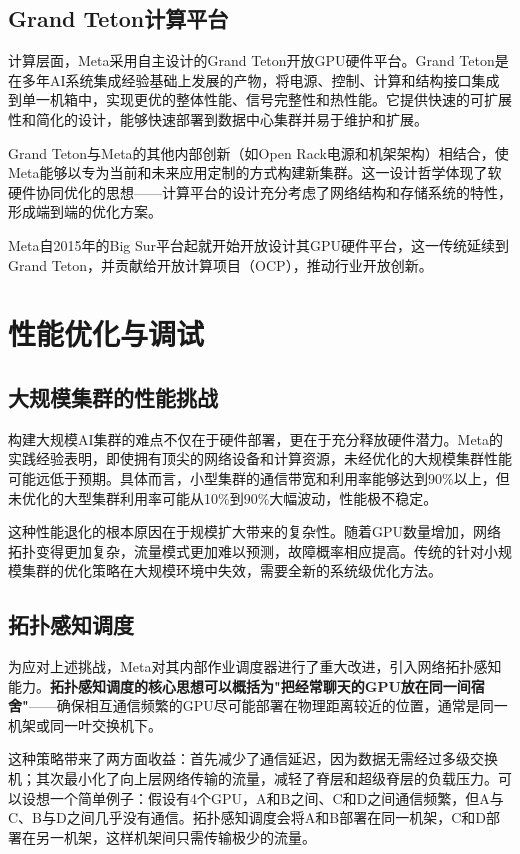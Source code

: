 \subsection{Grand Teton计算平台}

计算层面，Meta采用自主设计的Grand Teton开放GPU硬件平台。Grand Teton是在多年AI系统集成经验基础上发展的产物，将电源、控制、计算和结构接口集成到单一机箱中，实现更优的整体性能、信号完整性和热性能。它提供快速的可扩展性和简化的设计，能够快速部署到数据中心集群并易于维护和扩展。

Grand Teton与Meta的其他内部创新（如Open Rack电源和机架架构）相结合，使Meta能够以专为当前和未来应用定制的方式构建新集群。这一设计哲学体现了软硬件协同优化的思想——计算平台的设计充分考虑了网络结构和存储系统的特性，形成端到端的优化方案。

Meta自2015年的Big Sur平台起就开始开放设计其GPU硬件平台，这一传统延续到Grand Teton，并贡献给开放计算项目（OCP），推动行业开放创新。

\section{性能优化与调试}

\subsection{大规模集群的性能挑战}

构建大规模AI集群的难点不仅在于硬件部署，更在于充分释放硬件潜力。Meta的实践经验表明，即使拥有顶尖的网络设备和计算资源，未经优化的大规模集群性能可能远低于预期。具体而言，小型集群的通信带宽和利用率能够达到90\%以上，但未优化的大型集群利用率可能从10\%到90\%大幅波动，性能极不稳定。

这种性能退化的根本原因在于规模扩大带来的复杂性。随着GPU数量增加，网络拓扑变得更加复杂，流量模式更加难以预测，故障概率相应提高。传统的针对小规模集群的优化策略在大规模环境中失效，需要全新的系统级优化方法。

\subsection{拓扑感知调度}

为应对上述挑战，Meta对其内部作业调度器进行了重大改进，引入网络拓扑感知能力。\textbf{拓扑感知调度的核心思想可以概括为"把经常聊天的GPU放在同一间宿舍"}——确保相互通信频繁的GPU尽可能部署在物理距离较近的位置，通常是同一机架或同一叶交换机下。

这种策略带来了两方面收益：首先减少了通信延迟，因为数据无需经过多级交换机；其次最小化了向上层网络传输的流量，减轻了脊层和超级脊层的负载压力。可以设想一个简单例子：假设有4个GPU，A和B之间、C和D之间通信频繁，但A与C、B与D之间几乎没有通信。拓扑感知调度会将A和B部署在同一机架，C和D部署在另一机架，这样机架间只需传输极少的流量。

